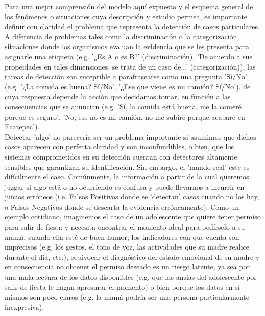 Para una mejor comprensión del modelo aquí expuesto y el esquema general de los fenómenos o situaciones cuya descripción y estudio permea, es importante definir con claridad el problema que representa la detección de casos particulares. A diferencia de problemas tales como la discriminación o la categorización, situaciones donde los organismos evaluan la evidencia que se les presenta para asignarle una etiqueta (e.g. '¿Es A o es B?' (discriminación), 'De acuerdo a sus propeidades en tales dimensiones, se trata de un caso de...' (categorización)), las tareas de detección son suceptible a parafrasearse como una pregunta 'Sí/No' (e.g. '¿La comida es buena? Sí/No', '¿Ese que viene es mi camión? Sí/No'), de cuya respuesta depende la acción que decidamos tomar, en función a las consecuencias que se anuncian (e.g. 'Sí, la comida está buena, me la comeré porque es seguro', 'No, ese no es mi camión, no me subiré porque acabaré en Ecatepec').\\ 

Detectar 'algo' no parecería ser un problema importante si asumimos que dichos casos aparecen con perfecta claridad y son inconfundibles, o bien, que los sistemas comprometidos en su detección cuentan con detectores altamente sensibles que garantizan su identificación. Sin embargo, el 'mundo real' este es difícilmente el caso. Comúnmente, la información a partir de la cual queremos juzgar si algo está o no ocurriendo es confusa y puede llevarnos a incurrir en juicios erróneos (i.e. Falsos Positivos donde se 'detectan' casos cuando no los hay, o Falsos Negativos donde se descarta la evidencia erróneamente). Como un ejemplo cotidiano, imaginemos el caso de un adolescente que quiere tener permiso para salir de fiesta y necesita encontrar el momento ideal para pedírselo a su mamá, cuando ella esté de buen humor; los indicadores con que cuenta son imprecisos (e.g. los gestos, el tono de voz, las actividades que su madre realice durante el día, etc.), equivocar el diagnóstico del estado emocional de su madre y en consecuencia no obtener el permiso deseado es un riesgo latente, ya sea por una mala lectura de los datos disponibles (e.g. que las ansias del adolescente por salir de fiesta le hagan apresurar el momento) o bien porque los datos en sí mismos son poco claros (e.g. la mamá podría ser una persona particularmente inexpresiva).\\ 

